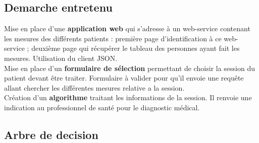 	\subsection{Demarche entretenu}
Mise en place d'une \textbf{application web} qui s'adresse à un web-service contenant les mesures des différents patients : première page d'identification à ce web-service ; deuxième page qui récupérer le tableau des personnes ayant fait les mesures. Utilisation du client JSON. \\
Mise en place d'un \textbf{formulaire de sélection} permettant de choisir la session du patient devant être traiter. Formulaire à valider pour qu'il envoie une requête allant chercher les différentes mesures relative a la session. \\
Création d'un \textbf{algorithme} traitant les informations de la session. Il renvoie une indication au professionnel de santé pour le diagnostic médical.

	\subsection{Arbre de decision}


